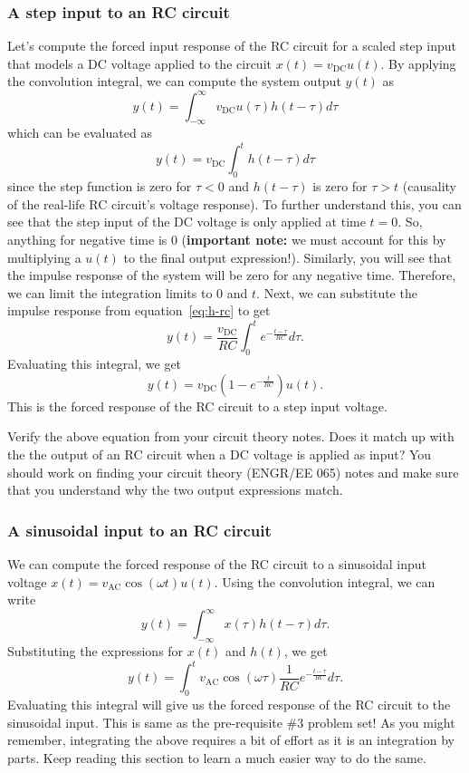 \subsubsection{A step input to an RC circuit}
Let's compute the forced input response of the RC circuit for a scaled step input that models a DC voltage applied to the circuit $x(t) = v_{\text{DC}} u(t)$. By applying the convolution integral, we can compute the system output $y(t)$ as 
\[
y(t) = \int_{-\infty}^{\infty} v_{\text{DC}} u(\tau) h(t - \tau) d\tau
\]
which can be evaluated as
\[
y(t) = v_{\text{DC}} \int_{0}^{t} h(t - \tau) d\tau
\]
since the step function is zero for $\tau < 0$ and $h(t - \tau)$ is zero for $\tau > t$ (causality of the real-life RC circuit's voltage response). To further understand this, you can see that the step input of the DC voltage is only applied at time $t = 0$. So, anything for negative time is 0 (\textbf{\color{blue}important note:} we must account for this by multiplying a $u(t)$ to the final output expression!). Similarly, you will see that the impulse response of the system will be zero for any negative time. Therefore, we can limit the integration limits to $0$ and $t$. Next, we can substitute the impulse response from equation~\eqref{eq:h-rc} to get
\[
y(t) = \frac{v_{\text{DC}}}{RC} \int_{0}^{t} e^{-\frac{t - \tau}{RC}} d\tau.
\]
Evaluating this integral, we get
\begin{equation}
    \label{eq:step-RC}
y(t) = v_{\text{DC}} \left(1 - e^{-\frac{t}{RC}}\right)u(t).
\end{equation}
This is the forced response of the RC circuit to a step input voltage. 
\begin{popquiz}
    Verify the above equation from your circuit theory notes. Does it match up with the the output of an RC circuit when a DC voltage is applied as input?
    \popqsplit
    You should work on finding your circuit theory (ENGR/EE 065) notes and make sure that you understand why the two output expressions match. 
\end{popquiz}

\subsubsection{A sinusoidal input to an RC circuit}
We can compute the forced response of the RC circuit to a sinusoidal input voltage $x(t) = v_{\text{AC}} \cos(\omega t) u(t)$. Using the convolution integral, we can write
\[
y(t) = \int_{-\infty}^{\infty} x(\tau) h(t - \tau) d\tau.
\]
Substituting the expressions for $x(t)$ and $h(t)$, we get
\begin{equation}
    \label{eq:sine-RC}
y(t) = \int_{0}^{t} v_{\text{AC}} \cos(\omega \tau)\frac{1}{RC} e^{-\frac{t - \tau}{RC}} d\tau.
\end{equation}
Evaluating this integral will give us the forced response of the RC circuit to the sinusoidal input. This is same as the pre-requisite \#3 problem set! As you might remember, integrating the above requires a bit of effort as it is an integration by parts. Keep reading this section to learn a much easier way to do the same. 
